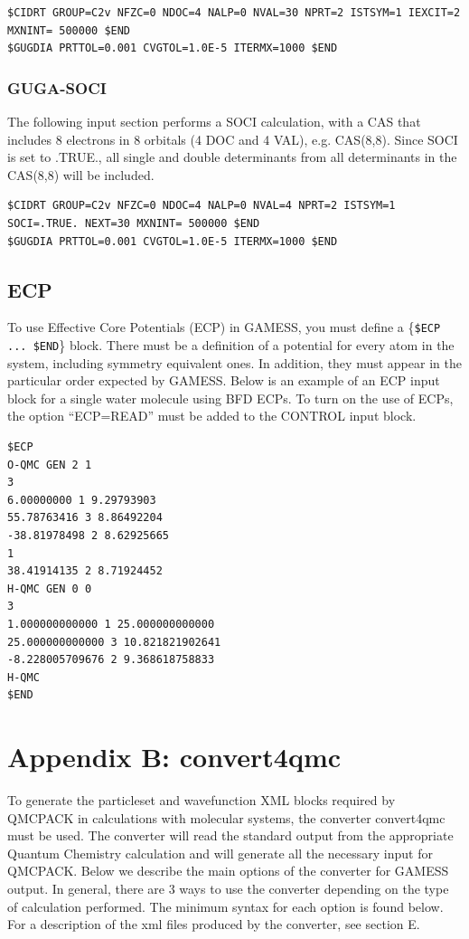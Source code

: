 \begin{lstlisting}
$CIDRT GROUP=C2v NFZC=0 NDOC=4 NALP=0 NVAL=30 NPRT=2 ISTSYM=1 IEXCIT=2 MXNINT= 500000 $END
$GUGDIA PRTTOL=0.001 CVGTOL=1.0E-5 ITERMX=1000 $END
\end{lstlisting}

\subsubsection{GUGA-SOCI}
The following input section performs a SOCI calculation, with a CAS that includes 8
electrons in 8 orbitals (4 DOC and 4 VAL), e.g. CAS(8,8). Since SOCI is set to .TRUE.,
all single and double determinants from all determinants in the CAS(8,8) will be included.

\begin{lstlisting}
$CIDRT GROUP=C2v NFZC=0 NDOC=4 NALP=0 NVAL=4 NPRT=2 ISTSYM=1 SOCI=.TRUE. NEXT=30 MXNINT= 500000 $END
$GUGDIA PRTTOL=0.001 CVGTOL=1.0E-5 ITERMX=1000 $END
\end{lstlisting}


\subsection{ECP}
To use Effective Core Potentials (ECP) in GAMESS, you must define a \{\texttt{\$ECP ... \$END}\} 
block. There must be a definition of a potential for every atom in the system, including
symmetry equivalent ones. In addition, they must appear in the particular order expected
by GAMESS. Below is an example of an ECP input block for a single water molecule using
BFD ECPs. To turn on the use of ECPs, the option “ECP=READ” must be added to the
CONTROL input block.

\begin{lstlisting}
$ECP
O-QMC GEN 2 1
3
6.00000000 1 9.29793903
55.78763416 3 8.86492204
-38.81978498 2 8.62925665
1
38.41914135 2 8.71924452
H-QMC GEN 0 0
3
1.000000000000 1 25.000000000000
25.000000000000 3 10.821821902641
-8.228005709676 2 9.368618758833
H-QMC
$END
\end{lstlisting}


\newpage
\section{Appendix B: convert4qmc}
To generate the particleset and wavefunction XML blocks required by QMCPACK in
calculations with molecular systems, the converter convert4qmc must be used. The converter
will read the standard output from the appropriate Quantum Chemistry calculation and will
generate all the necessary input for QMCPACK. Below we describe the main options of the
converter for GAMESS output. In general, there are 3 ways to use the converter depending
on the type of calculation performed. The minimum syntax for each option is found below.
For a description of the xml files produced by the converter, see section E.

